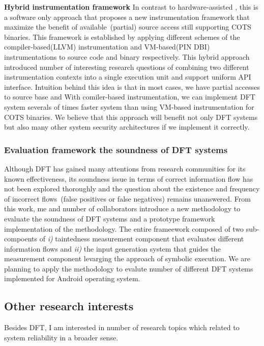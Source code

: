 \documentclass[letterpaper, 10pt]{article}
\begin{document}
\begin{small}
{\bf Hybrid instrumentation framework} In contrast to hardware-assisted \SR,
this is a software only approach that proposes a new instrumentation framework
that maximize the benefit of available~(partial) source access still supporting
COTS binaries.
%
This framework is established by applying different schemes of the
compiler-based(LLVM) instrumentation and VM-based(PIN DBI) instrumentations to
source code and binary respectively.
%
This hybrid approach introduced number of interesting research questions of
combining two different instrumentation contexts into a single execution unit
and support uniform API interface.
%
Intuition behind this idea is that in most cases, we have partial accesses to
source base and With comiler-based instrumentation, we can implement DFT system
severals of times faster system than using VM-based instrumentation for COTS
binaries.
%
We believe that this approach will benefit not only DFT systems but also many
other system security architectures if we implement it correctly.

\subsubsection*{Evaluation framework the soundness of DFT systems}
%
Although DFT has gained many attentions from research communities for its known
effectiveness, its soundness issue in terms of correct information flow has not
been explored thoroughly and the question about the existence and frequency of
incorrect flows~(false positives or false negatives) remains unanswered. From
this work, me and number of collaborators introduce a new methodology to
evaluate the soundness of DFT systems and a prototype framework implementation
of the methodology.
%
The entire frameework composed of two sub-compoents of {\it i)} taintedness
measurement component that evaluates different information flows and {\it ii)}
the input generation system that guides the measurement component levarging the
approach of symbolic execution. 
%
We are planning to apply the methodology to evalute number of different DFT
systems implemented for Android operating system.

\subsection*{Other research interests}
%
Besides DFT, I am interested in number of research topics which related to
system reliability in a broader sense.


\end{small}
\end{document}
